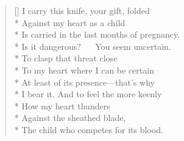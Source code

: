 \label{ch:new_lovers}
\settowidth{\versewidth}{Is carried in the last months of pregnancy.}
\begin{verse}[\versewidth]
I carry this knife, your gift, folded\\*
Against my heart as a child\\*
Is carried in the last months of pregnancy.\\*
Is it dangerous?       You seem uncertain.\\*
To clasp that threat close\\*
To my heart where I can be certain\\*
At least of its presence---that's why\\*
I bear it. And to feel the more keenly\\*
How my heart thunders\\*
Against the sheathed blade,\\*
The child who competes for its blood.
\end{verse}
